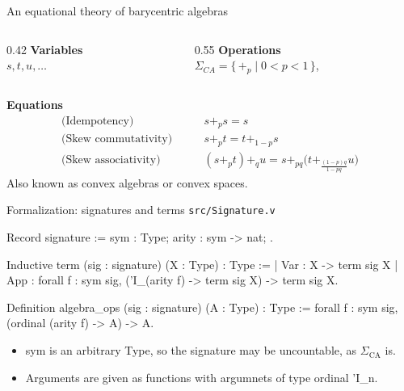 \documentclass[10pt,aspectratio=169]{beamer}
\newcommand{\bpl}[1]{+_{#1}}
\newcommand{\file}[1]{{\color{rocqcon}\texttt{#1}}}
\newcommand{\rid}[1]{{\ttfamily\small #1}}
\begin{document}
\begin{frame}{An equational theory of barycentric algebras}
    \begin{columns}[T]
        \begin{column}{0.42\textwidth}
            \textbf{Variables}\\[0.3em]
            $s,t,u,\dots$
        \end{column}
        \begin{column}{0.55\textwidth}
            \textbf{Operations}\\[0.3em]
            $\Sigma_{CA} = \{\,\bpl{p} \mid 0 < p < 1\,\}$,\\
        \end{column}
    \end{columns}
    \vfill
    \textbf{Equations}
    \begin{align*}
        \text{(Idempotency)}\qquad & s \bpl{p} s = s\\[0.3em]
        \text{(Skew commutativity)}\qquad & s \bpl{p} t = t \bpl{1-p} s\\[0.3em]
        \text{(Skew associativity)}\qquad & (s \bpl{p} t) \bpl{q} u
        = s \bpl{pq} \bigl(t \bpl{\frac{(1-p)q}{1-pq}} u\bigr)
    \end{align*}
    \vfill
    {\footnotesize Also known as convex algebras or convex spaces.}
\end{frame}

\begin{frame}[fragile]{Formalization: signatures and terms}
    \file{src/Signature.v}
    \begin{srcbox}
Record signature := {
  sym : Type;
  arity : sym -> nat;
}.

Inductive term (sig : signature) (X : Type) : Type :=
  | Var : X -> term sig X
  | App : forall f : sym sig, ('I_(arity f) -> term sig X) -> term sig X.

Definition algebra_ops (sig : signature) (A : Type) : Type :=
  forall f : sym sig, (ordinal (arity f) -> A) -> A.
    \end{srcbox}
    \begin{itemize}
        \item \rid{sym} is an arbitrary \rid{Type}, so the signature may be
            uncountable, as $\Sigma_{\mathrm{CA}}$ is.
        \item Arguments are given as functions with argumnets of type ordinal
            \rid{'I\_n}.
    \end{itemize}
\end{frame}
\end{document}
